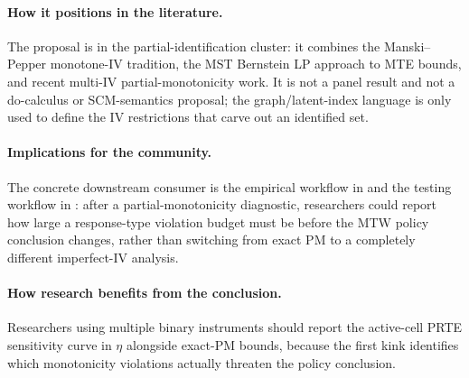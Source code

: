 \documentclass[11pt]{article}
\theoremstyle{definition}
\theoremstyle{plain}
\theoremstyle{remark}
\begin{document}
\paragraph{How it positions in the literature.}
The proposal is in the partial-identification cluster: it combines the Manski--Pepper monotone-IV tradition, the MST Bernstein LP approach to MTE bounds, and recent multi-IV partial-monotonicity work.  It is not a panel result and not a do-calculus or SCM-semantics proposal; the graph/latent-index language is only used to define the IV restrictions that carve out an identified set.

\paragraph{Implications for the community.}
The concrete downstream consumer is the empirical workflow in \citet{MogstadTorgovitskyWalters2021} and the testing workflow in \citet{JiangSun2023}: after a partial-monotonicity diagnostic, researchers could report how large a response-type violation budget must be before the MTW policy conclusion changes, rather than switching from exact PM to a completely different imperfect-IV analysis.

\paragraph{How research benefits from the conclusion.}
Researchers using multiple binary instruments should report the active-cell PRTE sensitivity curve in \(\eta\) alongside exact-PM bounds, because the first kink identifies which monotonicity violations actually threaten the policy conclusion.
\end{document}
